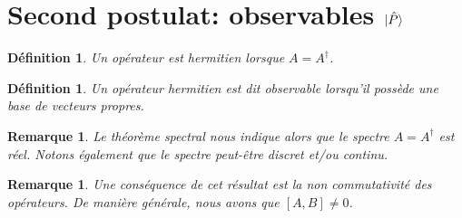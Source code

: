 \documentclass{report}
\numberwithin{equation}{part}
\newtheorem{definition}[theorem]{Définition}
\newtheorem{remark}[theorem]{Remarque}
\begin{document}
\section{Second postulat: observables $\ket{\hat{P}}$}

\begin{definition}
    Un opérateur est hermitien lorsque $A=A^\dagger$.
\end{definition}

\begin{definition}
    Un opérateur hermitien est dit observable lorsqu'il possède une base de vecteurs propres.
\end{definition}

\begin{remark}
    Le théorème spectral nous indique alors que le spectre $A=A^\dagger$ est réel. Notons également que le spectre peut-être discret et/ou continu. 
\end{remark}

\begin{remark}
    Une conséquence de cet résultat est la non commutativité des opérateurs. De manière générale, nous avons que $[A,B] \neq 0$.
\end{remark}
\end{document}
